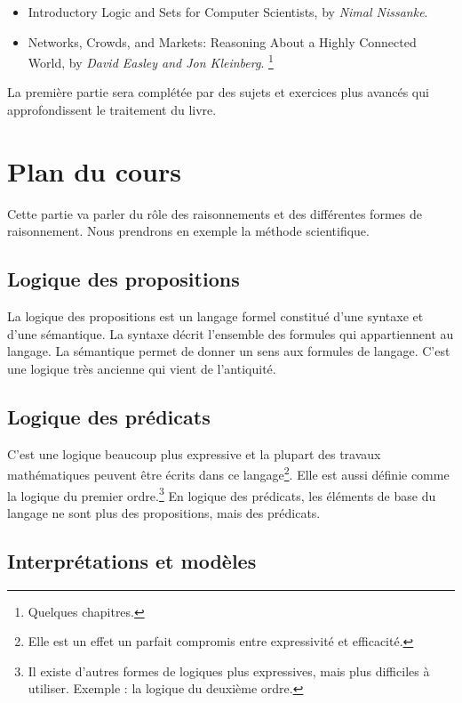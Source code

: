 \begin{itemize}
\item Introductory Logic and Sets for Computer Scientists, by \textit{Nimal Nissanke}.
\item Networks, Crowds, and Markets: Reasoning About a Highly Connected World, by \textit{David Easley and Jon Kleinberg}. \footnote{Quelques chapitres.}
\end{itemize}

La première partie sera complétée par des sujets et exercices plus avancés qui approfondissent le traitement du livre.

\section*{Plan du cours}

Cette partie va parler du rôle des raisonnements et des différentes formes de raisonnement. Nous prendrons en exemple la méthode scientifique.

\subsection*{Logique des propositions}

La logique des propositions est un langage formel constitué d'une syntaxe et d'une sémantique. La syntaxe décrit l'ensemble des formules qui appartiennent au langage. La sémantique permet de donner un sens aux formules de langage. C'est une logique très ancienne qui vient de l'antiquité. 

\subsection*{Logique des prédicats}

C'est une logique beaucoup plus expressive et la plupart des travaux mathématiques peuvent être écrits dans ce langage\footnote{Elle est un effet un parfait compromis entre expressivité et efficacité.}. Elle est aussi définie comme la logique du premier ordre.\footnote{Il existe d'autres formes de logiques plus expressives, mais plus difficiles à utiliser. Exemple : la logique du deuxième ordre. } En logique des prédicats, les éléments de base du langage ne sont plus des propositions, mais des prédicats. 

\subsection*{Interprétations et modèles}

